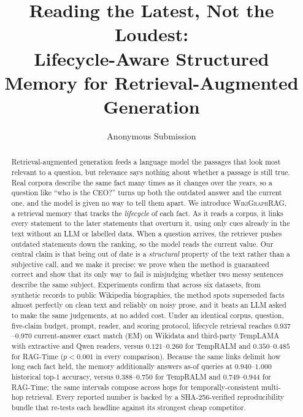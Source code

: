 \documentclass[letterpaper]{article}
\title{Reading the Latest, Not the Loudest:\\
Lifecycle-Aware Structured Memory for Retrieval-Augmented Generation}
\author{Anonymous Submission}
\theoremstyle{plain}
\newcommand{\ours}{\textsc{WikiGraphRAG}}
\begin{document}
\maketitle

\begin{abstract}
Retrieval-augmented generation feeds a language model the passages that look most relevant to a question, but relevance says nothing about whether a passage is still true. Real corpora describe the same fact many times as it changes over the years, so a question like ``who is the CEO?'' turns up both the outdated answer and the current one, and the model is given no way to tell them apart. We introduce \ours{}, a retrieval memory that tracks the \emph{lifecycle} of each fact. As it reads a corpus, it links every statement to the later statements that overturn it, using only cues already in the text without an LLM or labelled data. When a question arrives, the retriever pushes outdated statements down the ranking, so the model reads the current value. Our central claim is that being out of date is a \emph{structural} property of the text rather than a subjective call, and we make it precise: we prove when the method is guaranteed correct and show that its only way to fail is misjudging whether two messy sentences describe the same subject. Experiments confirm that across six datasets, from synthetic records to public Wikipedia biographies, the method spots superseded facts almost perfectly on clean text and reliably on noisy prose, and it beats an LLM asked to make the same judgements, at no added cost. Under an identical corpus, question, five-claim budget, prompt, reader, and scoring protocol, lifecycle retrieval reaches $0.937$--$0.970$ current-answer exact match (EM) on Wikidata and third-party TempLAMA with extractive and Qwen readers, versus $0.121$--$0.260$ for TempRALM and $0.350$--$0.485$ for RAG-Time ($p<0.001$ in every comparison). Because the same links delimit how long each fact held, the memory additionally answers as-of queries at $0.940$--$1.000$ historical top-1 accuracy, versus $0.388$--$0.750$ for TempRALM and $0.749$--$0.944$ for RAG-Time; the same intervals compose across hops for temporally-consistent multi-hop retrieval. Every reported number is backed by a SHA-256-verified reproducibility bundle that re-tests each headline against its strongest cheap competitor.
\end{abstract}

\end{document}
